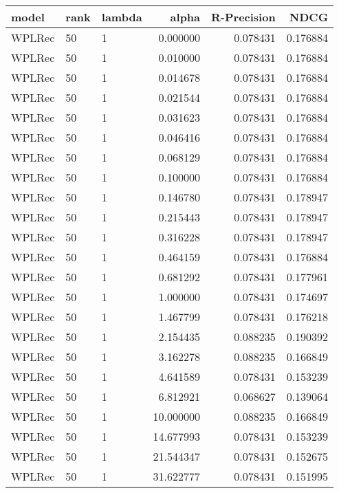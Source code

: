 \begin{tabular}{lllrrr}
\toprule
  model & rank & lambda &       alpha &  R-Precision &      NDCG \\
\midrule
 WPLRec &   50 &      1 &    0.000000 &     0.078431 &  0.176884 \\
 WPLRec &   50 &      1 &    0.010000 &     0.078431 &  0.176884 \\
 WPLRec &   50 &      1 &    0.014678 &     0.078431 &  0.176884 \\
 WPLRec &   50 &      1 &    0.021544 &     0.078431 &  0.176884 \\
 WPLRec &   50 &      1 &    0.031623 &     0.078431 &  0.176884 \\
 WPLRec &   50 &      1 &    0.046416 &     0.078431 &  0.176884 \\
 WPLRec &   50 &      1 &    0.068129 &     0.078431 &  0.176884 \\
 WPLRec &   50 &      1 &    0.100000 &     0.078431 &  0.176884 \\
 WPLRec &   50 &      1 &    0.146780 &     0.078431 &  0.178947 \\
 WPLRec &   50 &      1 &    0.215443 &     0.078431 &  0.178947 \\
 WPLRec &   50 &      1 &    0.316228 &     0.078431 &  0.178947 \\
 WPLRec &   50 &      1 &    0.464159 &     0.078431 &  0.176884 \\
 WPLRec &   50 &      1 &    0.681292 &     0.078431 &  0.177961 \\
 WPLRec &   50 &      1 &    1.000000 &     0.078431 &  0.174697 \\
 WPLRec &   50 &      1 &    1.467799 &     0.078431 &  0.176218 \\
 WPLRec &   50 &      1 &    2.154435 &     0.088235 &  0.190392 \\
 WPLRec &   50 &      1 &    3.162278 &     0.088235 &  0.166849 \\
 WPLRec &   50 &      1 &    4.641589 &     0.078431 &  0.153239 \\
 WPLRec &   50 &      1 &    6.812921 &     0.068627 &  0.139064 \\
 WPLRec &   50 &      1 &   10.000000 &     0.088235 &  0.166849 \\
 WPLRec &   50 &      1 &   14.677993 &     0.078431 &  0.153239 \\
 WPLRec &   50 &      1 &   21.544347 &     0.078431 &  0.152675 \\
 WPLRec &   50 &      1 &   31.622777 &     0.078431 &  0.151995 \\

\end{tabular}
